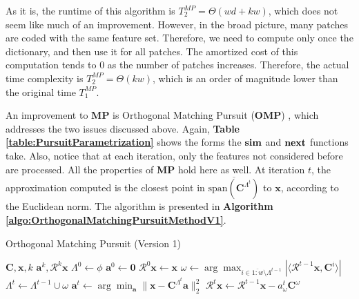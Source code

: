 \documentclass[12pt,a4paper,oneside,english]{UPBThesis}
\newcommand{\hcrange}[2]{\overline{{#1}\colon\!\!{#2}}}
\begin{document}
As it is, the runtime of this algorithm is $T_2^{MP} = \Theta(wd + kw)$, which does not seem like much of an improvement. However, in the broad picture, many patches are coded with the same feature set. Therefore, we need to compute only once the dictionary, and then use it for all patches. The amortized cost of this computation tends to $0$ as the number of patches increases. Therefore, the actual time complexity is $T_2^{MP} = \Theta(kw)$, which is an order of magnitude lower than the original time $T_1^{MP}$.

An improvement to \textbf{MP} is Orthogonal Matching Pursuit (\textbf{OMP}) \cite{matchingpursuit2,orthopursuit,pursuitdifferences}, which addresses the two issues discussed above. Again, \textbf{Table \ref{table:PursuitParametrization}} shows the forms the $\text{\textbf{sim}}$ and $\text{\textbf{next}}$ functions take. Also, notice that at each iteration, only the features not considered before are processed. All the properties of \textbf{MP} hold here as well. At iteration $t$, the approximation computed is the closest point in $\overline{\text{span}(\textbf{C}^{\Lambda^t})}$ to $\textbf{x}$, according to the Euclidean norm. The algorithm is presented in \textbf{Algorithm \ref{algo:OrthogonalMatchingPursuitMethodV1}}.

\begin{algorithm}
\caption{Orthogonal Matching Pursuit (Version 1)}
\label{algo:OrthogonalMatchingPursuitMethodV1}
\begin{algorithmic}
\Require $\textbf{C},\textbf{x},k$
\Ensure $\textbf{a}^k,\mathcal{R}^k\textbf{x}$
\State $\Lambda^0 \gets \phi$
\State $\textbf{a}^0 \gets \textbf{0}$
\State $\mathcal{R}^0\textbf{x} \gets \textbf{x}$
\For {$t = \hcrange{1}{k}$}
\State $\omega \gets \arg \max_{i \in \hcrange{1}{w} \setminus \Lambda^{t-1}} \left| \langle \mathcal{R}^{t-1}\textbf{x} , \textbf{C}^i \rangle \right|$
\State $\Lambda^t \gets \Lambda^{t-1} \cup \omega$
\State $\textbf{a}^t \gets \arg\min_{\textbf{a}} {\| \textbf{x} - \textbf{C}^{\Lambda^t}\textbf{a} \|_2^2}$
\State $\mathcal{R}^t\textbf{x} \gets \mathcal{R}^{t-1}\textbf{x} - a_\omega^t\textbf{C}^\omega$
\EndFor
\end{algorithmic}
\end{algorithm}
\end{document}
